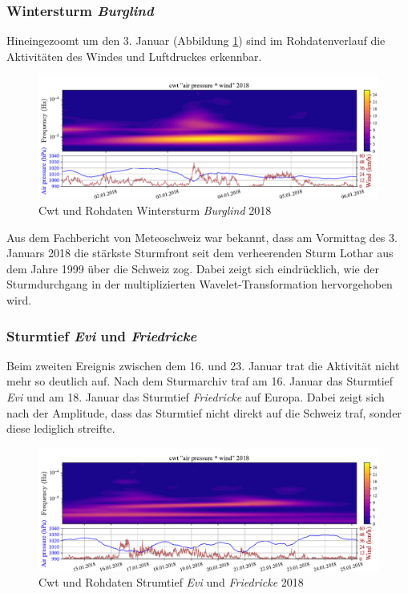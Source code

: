 \begin{refsection}
\subsubsection{Wintersturm {\em Burglind} }
\label{burglind}
Hineingezoomt um den 3. Januar (Abbildung \ref{fig:cwt_storm_zoom}) sind im Rohdatenverlauf die Aktivitäten des Windes und Luftdruckes erkennbar. 
\begin{figure}[b]
	\centering
	\includegraphics[width=1\textwidth]{papers/wwt/images/storm_airp_wind_zoom.pdf}
	\caption{Cwt und Rohdaten Wintersturm {\em Burglind}  2018}
	\label{fig:cwt_storm_zoom}
\end{figure}
Aus dem Fachbericht \space \cite{Fachbericht:Burglind} von Meteoschweiz war bekannt, dass am Vormittag des 3. Januars 2018 die stärkste Sturmfront seit dem verheerenden Sturm Lothar aus dem Jahre 1999 über die Schweiz zog.
Dabei zeigt sich eindrücklich, wie der Sturmdurchgang in der multiplizierten Wavelet-Transformation hervorgehoben wird.

\subsubsection{Sturmtief {\em Evi}  und {\em Friedricke} }
\label{evi}
Beim zweiten Ereignis zwischen dem 16. und 23. Januar trat die Aktivität nicht mehr so deutlich auf.
Nach dem Sturmarchiv  \cite{online:sturmarchiv} traf am 16. Januar das Sturmtief {\em Evi}  und am 18. Januar das Sturmtief {\em Friedricke} auf Europa. Dabei zeigt sich nach der Amplitude, dass das Sturmtief nicht direkt auf die Schweiz traf, sonder diese lediglich streifte. 

\begin{figure}[h]
	\centering
	\includegraphics[width=1\textwidth]{papers/wwt/images/storm_airp_wind_zoom2.pdf}
	\caption{Cwt und Rohdaten Strumtief {\em Evi}  und {\em Friedricke} 2018}
	\label{fig:cwt_storm_zoom2}
\end{figure}




\end{refsection}
